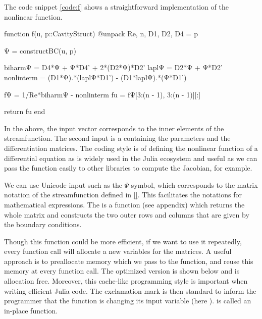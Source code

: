 The code snippet \ref{code:f} shows a straightforward implementation of the
nonlinear function. 

\begin{jllisting}
function f(u, p::CavityStruct)
    @unpack Re, n, D1, D2, D4 = p

    Ψ = constructBC(u, p)

    biharmΨ = D4*Ψ +  Ψ*D4' + 2*(D2*Ψ)*D2'
    laplΨ = D2*Ψ + Ψ*D2'
    nonlinterm = (D1*Ψ).*(laplΨ*D1') - (D1*laplΨ).*(Ψ*D1')
    
    fΨ = 1/Re*biharmΨ - nonlinterm
    fu = fΨ[3:(n - 1), 3:(n - 1)][:]

    return fu 
end
\end{jllisting}

In the above, the input vector  corresponds to the inner elements of
the streamfunction. The second input  is a 
containing the parameters and the differentiation matrices. The coding style is
of defining the nonlinear function of a differential equation as 
is widely used in the Julia ecosystem and useful as we can pass the function
easily to other libraries to compute the Jacobian, for example.

We can use Unicode input such as the $\Psi $ symbol, which corresponds to the
matrix notation of the streamfunction defined in \eqref{}. This facilitates the
notations for mathematical expressions. The  is a
function (see appendix) which returns the whole matrix and constructs the two
outer rows and columns that are given by the boundary conditions.

Though this function could be more efficient, if we want to use it repeatedly,
every function call will allocate a new variables for the matrices. A useful
approach is to preallocate memory which we pass to the function, and reuse this
memory at every function call. The optimized version is shown below and is
allocation free. Moreover, this cache-like programming style is important when
writing efficient Julia code. The exclamation mark is then standard to inform
the programmer that the function is changing its input variable (here
).  is called an in-place function.

